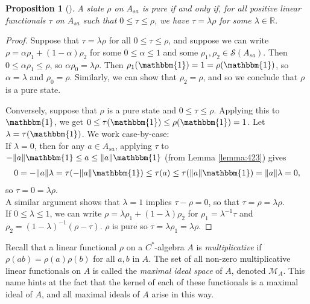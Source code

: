 \documentclass[12pt,a4paper]{report}
\theoremstyle{plain}
\newtheorem{prop}{Proposition}
\theoremstyle{definition}
\newcommand{\1}{\mathbbm{1}}
\newcommand{\R}{\mathbb{R}}
\newcommand{\M}{\mathcal{M}}
\renewcommand{\S}{\mathscr{S}}
\begin{document}
\begin{prop}[{\cite[3.4.6]{kadison83}}]\label{prop:pure2}
	A state $\rho$ on $A_{sa}$ is pure if and only if, for all positive linear functionals $\tau$ on
	 $A_{sa}$ such that $0\leq\tau\leq\rho$, we have $\tau =\lambda\rho$ for some $\lambda\in\R$. 
\end{prop}
\begin{proof}
	Suppose that $\tau =\lambda\rho$ for all $0\leq\tau\leq\rho$, and suppose we can write 
	$\rho=\alpha\rho_1+(1-\alpha)\rho_2$ for some $0\leq\alpha\leq1$ and some $\rho_1,\rho_2 \in
	\S(A_{sa})$. Then $0\leq\alpha\rho_1\leq\rho$, so $\alpha\rho_0 = \lambda\rho$. Then 
	$\rho_1(\1)=1=\rho(\1)$, so $\alpha = \lambda$ and $\rho_0 =\rho$. Similarly, we can show that 
	$\rho_2=\rho$, and so we conclude that $\rho$ is a pure state.
	
	Conversely, suppose that $\rho$ is a pure state and $0\leq\tau\leq\rho$. Applying this to $\1$,
	we get $0\leq\tau(\1)\leq\rho(\1) = 1$. Let $\lambda = \tau(\1)$. We work case-by-case: \\
	If $\lambda=0$, then for any $a\in A_{sa}$, applying $\tau$ to $-\|a\|\1\leq a\leq\|a\|\1$ 
	(from Lemma \ref{lemma:423}) gives
	\begin{align*}
		0=-\|a\|\lambda=\tau(-\|a\|\1)\leq\tau(a)\leq\tau(\|a\|\1)=\|a\|\lambda=0,
	\end{align*}
	so $\tau=0=\lambda\rho$. \\
	A similar argument shows that $\lambda=1$ implies $\tau-\rho=0$, so that $\tau=\rho=\lambda\rho$.\\
	If $0\leq\lambda\leq 1$, we can write $\rho=\lambda\rho_1+(1-\lambda)\rho_2$ for 
	$\rho_1=\lambda^{-1}\tau$ and $\rho_2=(1-\lambda)^{-1}(\rho-\tau)$. $\rho$ is pure so 
	$\tau=\lambda\rho_1=\lambda\rho$.
	
\end{proof}
Recall that a linear functional $\rho$ on a $C^\ast$-algebra $A$ is \emph{multiplicative} if $\rho(ab)=
\rho(a)\rho(b)$ for all $a,b$ in $A$. The set of all non-zero multiplicative linear functionals on $A$ 
is called the \emph{maximal ideal space} of $A$, denoted $\M_A$. This name hints at the fact that the 
kernel of each of these functionals is a maximal ideal of $A$, and all maximal ideals of $A$ arise in 
this way.\cite[Theorem I.2.5]{davidson96}
\end{document}
